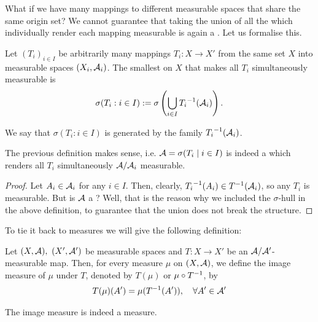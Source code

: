 What if we have many mappings to different measurable spaces that share the same origin set? We cannot guarantee that taking the union of all the \sigas which individually render each mapping measurable is again a \siga. Let us formalise this.

\begin{dfn}
	Let $(T_i)_{i \in I}$ be arbitrarily many mappings $T_i: X \to X'$ from the same set $X$ into measurable spaces $(X_i, \mathcal{A}_i)$. The smallest \siga on $X$ that makes all $T_i$ simultaneously measurable is
	\begin{align*}
		\sigma(T_i : i \in I) := \sigma \left(\bigcup_{i \in I} {T_i}^{-1}(\mathcal{A}_i)\right).
	\end{align*}
	
	We say that $\sigma(T_i : i \in I)$ is generated by the family ${T_i}^{-1}(\mathcal{A}_i)$.
\end{dfn}

\begin{lem}
	The previous definition makes sense, i.e. $\mathcal{A} = \sigma(T_i \mid i \in I)$ is indeed a \siga which renders all $T_i$ simultaneously $\mathcal{A}/\mathcal{A}_i$ measurable.
\end{lem}

\begin{proof}
	Let $A_i \in \mathcal{A}_i$ for any $i \in I$. Then, clearly, ${T_i}^{-1}(A_i) \in {T}^{-1}(\mathcal{A}_i)$, so any $T_i$ is measurable. But is $\mathcal{A}$ a \siga? Well, that is the reason why we included the $\sigma$-hull in the above definition, to guarantee that the union does not break the \siga structure.
\end{proof}

To tie it back to measures we will give the following definition:

\begin{dfn}
	Let $(X, \mathcal{A}),\ (X', \mathcal{A}')$ be measurable spaces and $T:X \to X'$ be an $\mathcal{A}/\mathcal{A}'$-measurable map. Then, for every measure $\mu$ on $(X, \mathcal{A})$, we define the image measure of $\mu$ under $T$, denoted by $T(\mu)$ or $\mu \circ {T}^{-1}$, by
	\begin{align*}
		T(\mu)(A') = \mu({T}^{-1}(A')),\quad \forall A' \in \mathcal{A}'
	\end{align*}
\end{dfn}

\begin{lem}
	The image measure is indeed a measure.
\end{lem}

